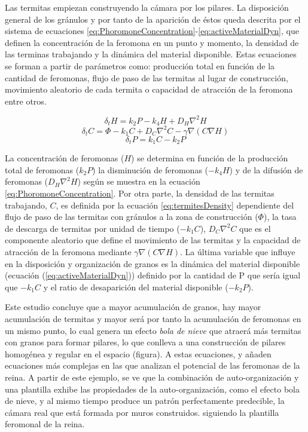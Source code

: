 Las termitas empiezan construyendo la cámara por los pilares. La disposición general de los gránulos y por tanto de la aparición de éstos queda descrita por el sistema de ecuaciones \eqref{eq:PhoromoneConcentration}-\eqref{eq:activeMaterialDyn},
que definen la concentración de la feromona en un punto y momento, la densidad de las terminas trabajando y la dinámica del material disponible. Estas ecuaciones se forman a partir de parámetros como: producción total en función de la cantidad de feromonas, flujo de paso de las termitas al lugar de construcción, movimiento aleatorio de cada termita o capacidad de atracción de la feromona entre otros. 

\begin{equation}\label{eq:PhoromoneConcentration}
    \delta_{t}H = k_{2}P-k_{4}H+D_{H}\nabla^{2}H
\end{equation}
\begin{equation}\label{eq:termitesDensity}
    \delta_{t}C = \Phi-k_{1}C+D_{C}\nabla^{2}C-\gamma\nabla(C\nabla H)
\end{equation}
\begin{equation}\label{eq:activeMaterialDyn}
    \delta_{t}P = k_{1}C-k_{2}P
\end{equation}

La concentración de feromonas ($H$) se determina en función de la producción total de feromonas ($k_{2}P$) la disminución de feromonas ($-k_{4}H$) y de la difusión de feromonas ($D_{H}\nabla^{2}H$) según se muestra en la ecuación \eqref{eq:PhoromoneConcentration}. Por otra parte, la densidad de las termitas trabajando, $C$, es definida por la ecuación \eqref{eq:termitesDensity} dependiente del flujo de paso de las termitas con gránulos a la zona de construcción ($\Phi$), la tasa de descarga de termitas por unidad de tiempo ($-k_{1}C$), $D_{C}\nabla^{2}C$ que es el componente aleatorio que define el movimiento de las termitas y la capacidad de atracción de la feromona mediante $\gamma\nabla(C\nabla H)$. La última variable que influye en la disposición y organización de granos es la dinámica del material disponible (ecuación (\ref{eq:activeMaterialDyn})) definido por la cantidad de P que sería igual que $-k_{1}C$ y el ratio de desaparición del material disponible ($-k_{2}P$).

Este estudio concluye que a mayor acumulación de granos, hay mayor acumulación de termitas y mayor será por tanto la acumulación de feromonas en un mismo punto, lo cual genera un efecto \textit{bola de nieve} que atraerá más termitas con granos para formar pilares, lo que conlleva a una construcción de pilares homogénea y regular en el espacio (figura). A estas ecuaciones, \citeauthor{deneubourg1977application} \cite{deneubourg1977application} y \citeauthor{bruinsma1979analysis} \cite{bruinsma1979analysis} añaden ecuaciones más complejas en las que analizan el potencial de las feromonas de la reina. A partir de este ejemplo, se ve que la combinación de auto-organización y una plantilla exhibe las propiedades de la auto-organización, como el efecto bola de nieve, y al mismo tiempo produce un patrón perfectamente predecible, la cámara real que está formada por muros construidos. siguiendo la plantilla feromonal de la reina.

